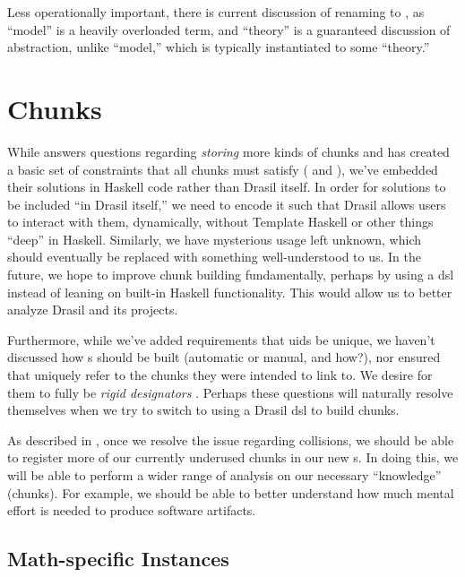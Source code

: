Less operationally important, there is current discussion of renaming
\ModelKinds{} to \TheoryKinds{} \cite{DrasilIssue2599RenamingModels}, as
``model'' is a heavily overloaded term, and ``theory'' is a guaranteed
discussion of abstraction, unlike ``model,'' which is typically instantiated to
some ``theory.''

\section{Chunks}
\label{chap:futureWork:sec:chunks}

While  answers questions regarding \textit{storing}
more kinds of chunks and has created a basic set of constraints that all chunks
must satisfy (\HasUID{} and \HasChunkRefs{}), we've embedded their solutions in
Haskell code rather than Drasil itself. In order for solutions to be included
``in Drasil itself,'' we need to encode it such that Drasil allows users to
interact with them, dynamically, without Template
Haskell\cite{GHC2020TemplateHaskell} or other things ``deep'' in Haskell.
Similarly, we have mysterious \Typeable{} usage left unknown, which should
eventually be replaced with something well-understood to us. In the future, we
hope to improve chunk building fundamentally, perhaps by using a \acs{dsl}
instead of leaning on built-in Haskell functionality. This would allow us to
better analyze Drasil and its projects.

Furthermore, while we've added requirements that \acsp{uid} be unique, we
haven't discussed how \UID{}s should be built (automatic or manual, and how?),
nor ensured that \UID{} uniquely refer to the chunks they were intended to link
to. We desire for them to fully be \textit{rigid designators}
\cite{Kripke1972NandN}. Perhaps these questions will naturally resolve
themselves when we try to switch to using a Drasil \acs{dsl} to build chunks.

As described in , once we resolve the issue regarding
\UID{} collisions, we should be able to register more of our currently underused
chunks in our new \ChunkDB{}s. In doing this, we will be able to perform a wider
range of analysis on our necessary ``knowledge'' (chunks). For example, we
should be able to better understand how much mental effort is needed to produce
software artifacts.

\subsection{Math-specific Instances}
\label{chap:futureWork:sec:chunks:sub:mathSpecific}

